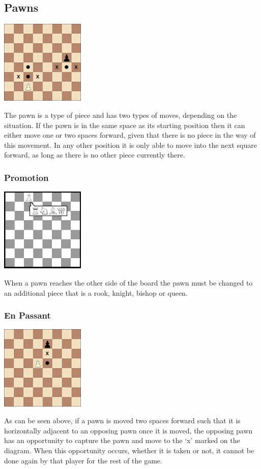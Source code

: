 \documentclass[]{report}
\begin{document}
\subsection{Pawns}
\begin{center}
	\includegraphics[width=0.3\textwidth]{images/boards/pawn_movement}
\end{center}
The pawn is a type of piece and has two types of moves, depending on the situation. If the pawn is in the same space as its starting position then it can either move one or two spaces forward, given that there is no piece in the way of this movement. In any other position it is only able to move into the next square forward, as long as there is no other piece currently there. 
\subsubsection{Promotion}
\begin{center}
	\includegraphics[width=0.3\textwidth]{images/boards/promotion}
\end{center}
When a pawn reaches the other side of the board the pawn must be changed to an additional piece that is a rook, knight, bishop or queen.
\subsubsection{En Passant}
\begin{center}
	\includegraphics[width=0.3\textwidth]{images/boards/en_passant}
\end{center}
As can be seen above, if a pawn is moved two spaces forward such that it is horizontally adjacent to an opposing pawn once it is moved, the opposing pawn has an opportunity to capture the pawn and move to the ‘x’ marked on the diagram. When this opportunity occurs, whether it is taken or not, it cannot be done again by that player for the rest of the game.
\end{document}
